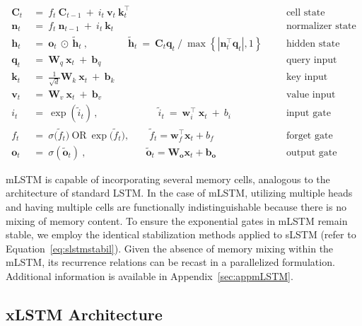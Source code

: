 \begin{align}
\label{eq:mlstm_recurrent_begin}
\mathbf{C}_t \ &= \  f_t \ \mathbf{C}_{t-1} \ + \ 
  i_t \ \mathbf{v}_t \ \mathbf{k}_t^\top & &  &\text{cell state} \\
\mathbf{n}_t \ &= \  f_t \ \mathbf{n}_{t-1} \ + \ 
  i_t \ \mathbf{k}_t & &  &\text{normalizer state} \\
\mathbf{h}_t  \ &= \ \mathbf{o}_t \ \odot \ \tilde{\mathbf{h}}_t
\ , \qquad \qquad 
\tilde{\mathbf{h}}_t \ = \   \mathbf{C}_t \mathbf{q}_t \ / \ 
  \max \left\{ |\mathbf{n}_t^\top \mathbf{q}_t|, 1 \right\} 
   &&&\text{hidden state} \\
\mathbf{q}_t \ &= \ \mathbf{W}_q \ \mathbf{x}_t \ + \ \mathbf{b}_q  & &  &\text{query input} \\
\mathbf{k}_t \ &= \ \frac{1}{\sqrt{d}} \mathbf{W}_k \ \mathbf{x}_t \ + \ \mathbf{b}_k  & &  &\text{key input} \\
\mathbf{v}_t \ &= \ \mathbf{W}_v \ \mathbf{x}_t \ + \ \mathbf{b}_v  & &  &\text{value input} \\
i_t \ &= \ \exp \! \left(\tilde{i}_t\right) \,, 
\qquad \qquad \qquad 
  \tilde{i}_t \ = \ \mathbf{w}^\top_{i} \ \mathbf{x}_t \ + \  b_{i} \ \ \ 
  &&&\text{input gate} \\
f_t \ &= \ \sigma \big( \tilde{f}_t \big) \ \text{OR} \ \exp \big( \tilde{f}_t \big), 
\qquad
\tilde{f}_t = \mathbf{w}^\top_{f} \mathbf{x}_t + b_{f}
  &&& \text{forget gate} \\
\label{eq:mlstm_recurrent_end}
\mathbf{o}_t \ &= \ \sigma \left( \tilde{\mathbf{o}}_t \right) \ , \qquad \qquad \qquad 
  \tilde{\mathbf{o}}_t  = \mathbf{W}_{\mathbf{o}} \mathbf{x}_t + 
  \mathbf{b}_{\mathbf{o}}
  &&&\text{output gate} 
\end{align}

mLSTM is capable of incorporating several memory cells, analogous to the architecture of standard LSTM. In the case of mLSTM, utilizing multiple heads and having multiple cells are functionally indistinguishable because there is no mixing of memory content. To ensure the exponential gates in mLSTM remain stable, we employ the identical stabilization methods applied to sLSTM (refer to Equation~\ref{eq:slstmstabil}). 
Given the absence of memory mixing within the mLSTM, its recurrence relations can be recast in a parallelized formulation. Additional information is available in Appendix~\ref{sec:appmLSTM}.

\subsection{xLSTM Architecture}
\label{sec:xLSTMarch}

